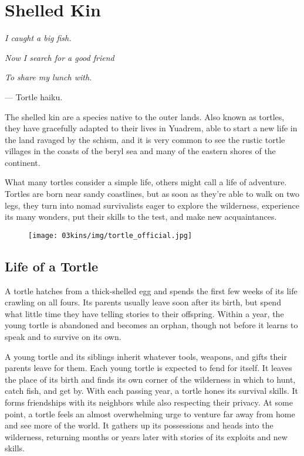 
\section{Shelled Kin}
\begin{linenumbers}
\textit{I caught a big fish.}

\textit{Now I search for a good friend}

\textit{To share my lunch with.}

\hspace*{\fill} --- Tortle haiku.

The shelled kin are a species native to the outer lands.
Also known as tortles, they have gracefully adapted to their lives in Yuadrem, able to start a new life in the land ravaged by the schism, and it is very common to see the rustic tortle villages in the coasts of the beryl sea and many of the eastern shores of the continent.

What many tortles consider a simple life, others might call a life of adventure.
Tortles are born near sandy coastlines, but as soon as they're able to walk on two legs, they turn into nomad survivalists eager to explore the wilderness, experience its many wonders, put their skills to the test, and make new acquaintances.

\begin{figure}[!b]
    \centering
    \texttt{[image: 03kins/img/tortle\_official.jpg]}
\end{figure}

\subsection*{Life of a Tortle}
A tortle hatches from a thick-shelled egg and spends the first few weeks of its life crawling on all fours.
Its parents usually leave soon after its birth, but spend what little time they have telling stories to their offspring. 
Within a year, the young tortle is abandoned and becomes an orphan, though not before it learns to speak and to survive on its own.

A young tortle and its siblings inherit whatever tools, weapons, and gifts their parents leave for them.
Each young tortle is expected to fend for itself.
It leaves the place of its birth and finds its own corner of the wilderness in which to hunt, catch fish, and get by.
With each passing year, a tortle hones its survival skills.
It forms friendships with its neighbors while also respecting their privacy.
At some point, a tortle feels an almost overwhelming urge to venture far away from home and see more of the world.
It gathers up its possessions and heads into the wilderness, returning months or years later with stories of its exploits and new skills.


\end{linenumbers}
